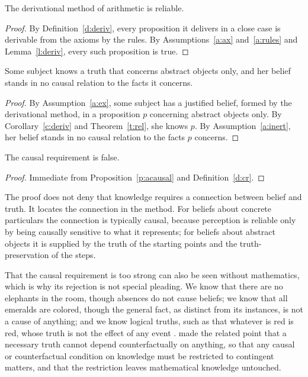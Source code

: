 \documentclass{situationist-preprint}
\begin{document}
\begin{corollary}\label{c:deriv}
The derivational method of arithmetic is reliable.
\end{corollary}

\begin{proof}
By Definition~\ref{d:deriv}, every proposition it delivers in a close case is derivable from the axioms by the rules. By Assumptions~\ref{a:ax} and~\ref{a:rules} and Lemma~\ref{l:deriv}, every such proposition is true.
\end{proof}

\begin{proposition}\label{p:acausal}
Some subject knows a truth that concerns abstract objects only, and her belief stands in no causal relation to the facts it concerns.
\end{proposition}

\begin{proof}
By Assumption~\ref{a:ex}, some subject has a justified belief, formed by the derivational method, in a proposition $p$ concerning abstract objects only. By Corollary~\ref{c:deriv} and Theorem~\ref{t:rel}, she knows $p$. By Assumption~\ref{a:inert}, her belief stands in no causal relation to the facts $p$ concerns.
\end{proof}

\begin{theorem}\label{t:main}
The causal requirement is false.
\end{theorem}

\begin{proof}
Immediate from Proposition~\ref{p:acausal} and Definition~\ref{d:cr}.
\end{proof}

The proof does not deny that knowledge requires a connection between belief and truth. It locates the connection in the method. For beliefs about concrete particulars the connection is typically causal, because perception is reliable only by being causally sensitive to what it represents; for beliefs about abstract objects it is supplied by the truth of the starting points and the truth-preservation of the steps.

That the causal requirement is too strong can also be seen without mathematics, which is why its rejection is not special pleading. We know that there are no elephants in the room, though absences do not cause beliefs; we know that all emeralds are colored, though the general fact, as distinct from its instances, is not a cause of anything; and we know logical truths, such as that whatever is red is red, whose truth is not the effect of any event \citep{Steiner1973}. \citet[\S2.4]{Lewis1986} made the related point that a necessary truth cannot depend counterfactually on anything, so that any causal or counterfactual condition on knowledge must be restricted to contingent matters, and that the restriction leaves mathematical knowledge untouched. 
\end{document}
